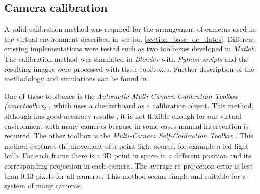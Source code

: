 \subsection{Camera calibration}\label{calibracion}

A valid calibration method was required for the arrangement of cameras used in the virtual environment described in section \ref{section_base_de_datos}. Different existing implementations were tested such as two toolboxes developed in \emph{Matlab}. The calibration method was simulated in \emph{Blender} with \emph{Python}  \textit{scripts} and the resulting images were processed with these toolboxes. Further description of the methodology and simulations can be found in \cite{proyecto_biomecanica}.

One of these toolboxes is the \textit{Automatic Multi-Camera Calibration Toolbox (amcctoolbox)} \cite{amcctoolbox}, which uses a checkerboard as a calibration object. This method, although has good accuracy results \cite{zhang_libro}, it is not flexible enough for our virtual environment with many cameras because in some cases manual intervention is required. The other toolbox is the \textit{Multi-Camera Self-Calibration Toolbox} \cite{toolbox_led}. This method captures the movement of a point light source, for example a led light bulb. For each frame there is a 3D point in space in a different position and its corresponding projection in each camera. The average re-projection error is less than 0.13 pixels for all cameras. This method seems simple and suitable for a system of many cameras.



